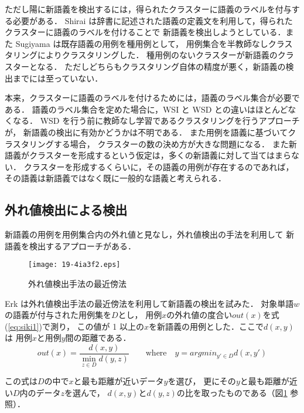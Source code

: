 \documentclass[japanese]{jnlp_1.4}
\begin{document}
ただし陽に新語義を検出するには，得られたクラスターに語義のラベルを付与する必要がある\cite{tanaka-h}．
Shirai は辞書に記述された語義の定義文を利用して，得られたクラスターに語義のラベルを付けることで
新語義を検出しようとしている\cite{shirai-semeval2}．また Sugiyama は既存語義の用例を種用例として，
用例集合を半教師なしクラスタリングによりクラスタリングした\cite{sugiyama}．
種用例のないクラスターが新語義のクラスターとなる．
ただしどちらもクラスタリング自体の精度が悪く，新語義の検出までには至っていない．

本来，クラスターに語義のラベルを付けるためには，語義のラベル集合が必要である．
語義のラベル集合を定めた場合に，WSI と WSD との違いはほとんどなくなる．
WSD を行う前に教師なし学習であるクラスタリングを行うアプローチが，
新語義の検出に有効かどうかは不明である．
また用例を語義に基づいてクラスタリングする場合，
クラスターの数の決め方が大きな問題になる\cite{agirre}．
また新語義がクラスターを形成するという仮定は，多くの新語義に対して当てはまらない．
クラスターを形成するくらいに，その語義の用例が存在するのであれば，
その語義は新語義ではなく既に一般的な語義と考えられる．



\subsection{外れ値検出による検出}

新語義の用例を用例集合内の外れ値と見なし，外れ値検出の手法を利用して
新語義を検出するアプローチがある．

\begin{figure}[b]
\begin{center}
\texttt{[image: 19-4ia3f2.eps]}
\end{center}
\caption{外れ値検出手法の最近傍法}
\label{fig-erk}
\end{figure} 

Erk は外れ値検出手法の最近傍法を利用して新語義の検出を試みた\cite{erk}．
対象単語\( w \)の語義が付与された用例集を\( D \)とし，
用例\( x \)の外れ値の度合い\( out(x) \)を\mbox{式(\ref{eq:siki1})}で測り，
この値が 1 以上の\( x \)を新語義の用例とした．ここで\( d(x,y) \)は
用例\( x \)と用例\( y \)間の距離である．
\begin{equation}
out(x) = \frac{d(x,y)}{\min_{z \in D} d(y,z)} \qquad
  \text{where} \quad  y = argmin_{y' \in D} d(x,y')   \label{eq:siki1}
\end{equation}

この式は\( D \)の中で\( x \)と最も距離が近いデータ\( y \)を選び，
更にその\( y \)と最も距離が近い\( D \)内のデータ\( z \)を選んで，
\( d(x,y) \)と\( d(y,z) \)の比を取ったものである（図\ref{fig-erk} 参照）．
\end{document}
